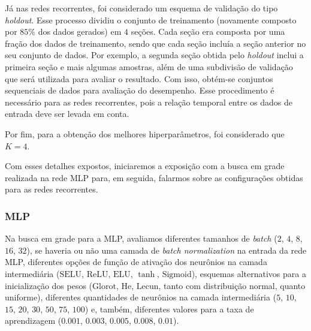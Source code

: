 \documentclass[a4paper, 12pt]{article}
\newcommand{\sigmoid}{\text{Sigmoid}}
\newcommand{\selu}{\text{SELU}}
\newcommand{\relu}{\text{ReLU}}
\newcommand{\elu}{\text{ELU}}
\newcommand{\lecun}{\text{Lecun}}
\newcommand{\he}{\text{He}}
\newcommand{\glorot}{\text{Glorot}}
\begin{document}
Já nas redes recorrentes, foi considerado um esquema de validação do tipo \textit{holdout}. Esse processo dividiu o conjunto de treinamento (novamente composto por $85\%$ dos dados gerados) em $4$ seções. Cada seção era composta por uma fração dos dados de treinamento, sendo que cada seção incluía a seção anterior no seu conjunto de dados. Por exemplo, a segunda seção obtida pelo \textit{holdout} inclui a primeira seção e mais algumas amostras, além de uma subdivisão de validação que será utilizada para avaliar o resultado. Com isso, obtém-se conjuntos sequenciais de dados para avaliação do desempenho. Esse procedimento é necessário para as redes recorrentes, pois a relação temporal entre os dados de entrada deve ser levada em conta.

Por fim, para a obtenção dos melhores hiperparâmetros, foi considerado que $K = 4$. 

Com esses detalhes expostos, iniciaremos a exposição com a busca em grade realizada na rede MLP para, em seguida, falarmos sobre as configurações obtidas para as redes recorrentes.

\subsubsection{MLP}

Na busca em grade para a MLP, avaliamos diferentes tamanhos de \textit{batch} ($2$, $4$, $8$, $16$, $32$), se haveria ou não uma camada de \textit{batch normalization} na entrada da rede MLP, diferentes opções de função de ativação dos neurônios na camada intermediária ($\selu$, $\relu$, $\elu$, $\tanh$, $\sigmoid$), esquemas alternativos para a inicialização dos pesos ($\glorot$, $\he$, $\lecun$, tanto com distribuição normal, quanto uniforme), diferentes quantidades de neurônios na camada intermediária ($5$, $10$, $15$, $20$, $30$, $50$, $75$, $100$) e, também, diferentes valores para a taxa de aprendizagem ($0.001$, $0.003$, $0.005$, $0.008$, $0.01$). 
\end{document}
